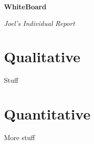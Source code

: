 \documentclass[12 pt]{article}
\begin{document}
\begin{center}

    \huge{\textbf{WhiteBoard}}

    \huge{\textit{Joel's Individual Report}}

\end{center}

\vspace{10 pt}

\section{Qualitative}

Stuff

\section{Quantitative}

More stuff
\end{document}
